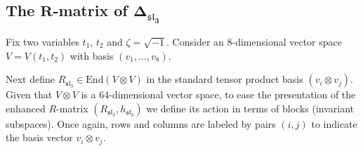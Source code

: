 \documentclass[10pt,a4paper]{amsart}
\numberwithin{equation}{section}
\theoremstyle{definition}
\begin{document}
\subsection[The R-matrix of Delta\_\{sl\_3\}]{The $\boldsymbol{R}$-matrix of $\boldsymbol{\Delta_{\mathfrak{sl}_3}}$}
\label{sec:app4}

Fix two variables $t_1$, $t_2$ and $\zeta=\sqrt{-1}$. Consider an 8-dimensional
vector space $V=V(t_1,t_2)$ with basis $(v_1,\dots,v_8)$.

Next define $R_{\mathfrak{sl}_3}\in\mathrm{End}{(V\otimes V)}$ in the standard tensor product
basis $(v_i\otimes v_j)$. Given that $V\otimes V$ is a 64-dimensional vector space,
to ease the presentation of the enhanced $R$-matrix $(R_{\mathfrak{sl}_3},h_{\mathfrak{sl}_3})$
we define its action in terms of blocks
(invariant subspaces). Once again, rows and columns are labeled by pairs $(i,j)$
to indicate the basis vector $v_i\otimes v_j$.
\end{document}
